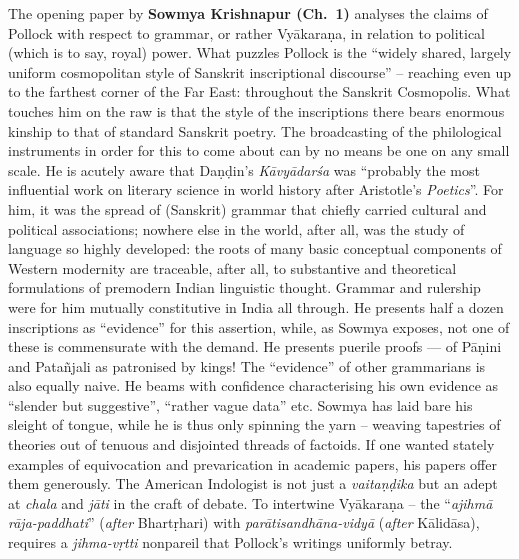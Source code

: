 The opening paper by {\bf Sowmya Krishnapur (Ch.~1)} analyses the claims of Pollock with respect to grammar, or rather Vyākaraṇa, in relation to political (which is to say, royal) power. What puzzles Pollock is the “widely shared, largely uniform cosmopolitan style of Sanskrit inscriptional discourse” -- reaching even up to the farthest corner of the Far East: throughout the Sanskrit Cosmopolis. What touches him on the raw is that the style of the inscriptions there bears enormous kinship to that of standard Sanskrit poetry. The broadcasting of the philological instruments in order for this to come about can by no means be one on any small scale. He is acutely aware that Daṇḍin’s {\sl Kāvyādarśa} was “probably the most influential work on literary science in world history after Aristotle’s {\sl Poetics}”. For him, it was the spread of (Sanskrit) grammar that chiefly carried cultural and political associations; nowhere else in the world, after all, was the study of language so highly developed: the roots of many basic conceptual components of Western modernity are traceable, after all, to substantive and theoretical formulations of premodern Indian linguistic thought. Grammar and rulership were for him mutually constitutive in India all through. He presents half a dozen inscriptions as “evidence” for this assertion, while, as Sowmya exposes, not one of these is commensurate with the demand. He presents puerile proofs --- of Pāṇini and Patañjali as patronised by kings! The “evidence” of other grammarians is also equally naive. He beams with confidence characterising his own evidence as “slender but suggestive”, “rather vague data” etc. Sowmya has laid bare his sleight of tongue, while he is thus only spinning the yarn – weaving tapestries of theories out of tenuous and disjointed threads of factoids. If one wanted stately examples of equivocation and prevarication in academic papers, his papers offer them generously. The American Indologist is not just a {\sl vaitaṇḍika} but an adept at {\sl chala} and {\sl jāti} in the craft of debate. To intertwine Vyākaraṇa -- the “{\sl ajihmā rāja-paddhati}” ({\sl after} Bhartṛhari) with {\sl parātisandhāna-vidyā} ({\sl after} Kālidāsa), requires a {\sl jihma-vṛtti} nonpareil that Pollock’s writings uniformly betray.
\vskip 8pt

